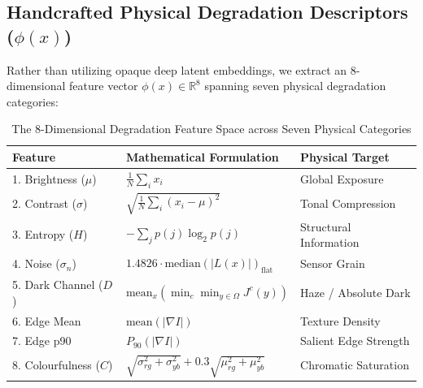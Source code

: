 \documentclass[journal]{IEEEtran}
\begin{document}
\subsection{Handcrafted Physical Degradation Descriptors (\texorpdfstring{$\phi(x)$}{phi(x)})}
Rather than utilizing opaque deep latent embeddings, we extract an 8-dimensional feature vector $\phi(x) \in \mathbb{R}^8$ spanning seven physical degradation categories:

\begin{table}[!t]
\centering
\caption{The 8-Dimensional Degradation Feature Space across Seven Physical Categories}
\label{tab:features}
\begin{tabular}{lll}
\toprule
\textbf{Feature} & \textbf{Mathematical Formulation} & \textbf{Physical Target} \\
\midrule
1. Brightness ($\mu$) & $\frac{1}{N} \sum_{i} x_i$ & Global Exposure \\
2. Contrast ($\sigma$) & $\sqrt{\frac{1}{N} \sum_{i} (x_i - \mu)^2}$ & Tonal Compression \\
3. Entropy ($H$) & $-\sum_{j} p(j) \log_2 p(j)$ & Structural Information \\
4. Noise ($\sigma_n$) & $1.4826 \cdot \text{median}(|L(x)|)_{\text{flat}}$ & Sensor Grain \\
5. Dark Channel ($D$) & $\text{mean}_x(\min_{c} \min_{y \in \Omega} J^c(y))$ & Haze / Absolute Dark \\
6. Edge Mean & $\text{mean}(|\nabla I|)$ & Texture Density \\
7. Edge p90 & $P_{90}(|\nabla I|)$ & Salient Edge Strength \\
8. Colourfulness ($C$) & $\sqrt{\sigma_{rg}^2 + \sigma_{yb}^2} + 0.3 \sqrt{\mu_{rg}^2 + \mu_{yb}^2}$ & Chromatic Saturation \\
\bottomrule
\end{tabular}
\end{table}
\end{document}
